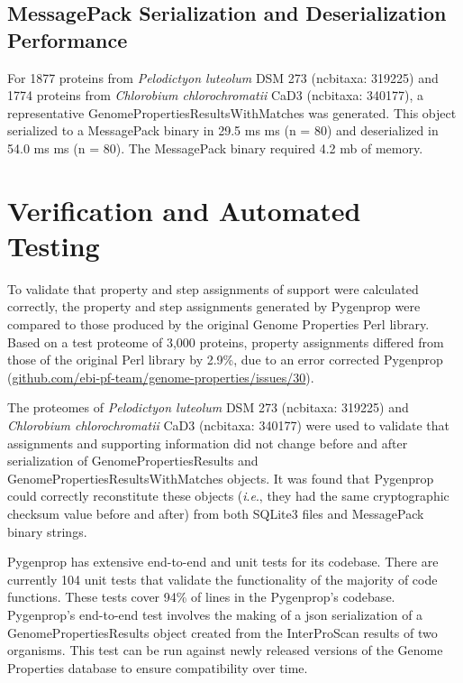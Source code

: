 \subsection{MessagePack Serialization and Deserialization Performance} 
\label{messagepack-performance}

For 1877 proteins from \textit{Pelodictyon luteolum} DSM 273 (\gls{ncbitaxa}:  
319225) and 1774 proteins from \textit{Chlorobium chlorochromatii} CaD3 
(\gls{ncbitaxa}: 340177), a representative GenomePropertiesResultsWithMatches 
was generated. This object serialized to a MessagePack binary in 29.5 ms  ms (\gls{n} = 80) and deserialized in 54.0 ms  ms (\gls{n} = 80). 
The MessagePack binary required 4.2 \gls{mb} of memory.

\section{Verification and Automated Testing}

To validate that property and step assignments of support were calculated 
correctly, the property and step assignments generated by Pygenprop were 
compared to those produced by the original Genome Properties Perl library. Based 
on a test proteome of 3,000 proteins, property assignments differed from those 
of the original Perl library by 2.9\%, due to an error corrected Pygenprop 
(\href{http://github.com/ebi-pf-team/genome-properties/issues/30}{github.com/ebi-pf-team/genome-properties/issues/30}).

The proteomes of \textit{Pelodictyon luteolum} DSM 273 (\gls{ncbitaxa}:  319225) 
and \textit{Chlorobium chlorochromatii} CaD3 (\gls{ncbitaxa}: 340177) were used 
to validate that assignments and supporting information did not change before 
and after serialization of GenomePropertiesResults and 
GenomePropertiesResultsWithMatches objects. It was found that Pygenprop could 
correctly reconstitute these objects (\textit{i}.\textit{e}., they had the same 
cryptographic checksum value before and after) from both SQLite3 files and 
MessagePack binary strings.

Pygenprop has extensive end-to-end and unit tests for its codebase. There are 
currently 104 unit tests that validate the functionality of the majority of code 
functions. These tests cover 94\% of lines in the Pygenprop's codebase. 
Pygenprop's end-to-end test involves the making of a \gls{json} serialization of 
a GenomePropertiesResults object created from the InterProScan results of two 
organisms. This test can be run against newly released versions of the Genome 
Properties database to ensure compatibility over time. 

